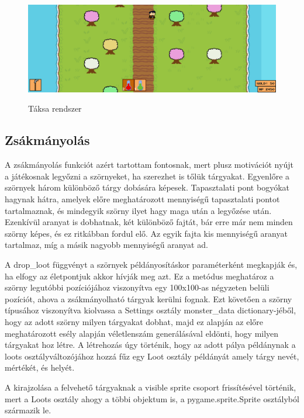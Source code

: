 \begin{figure}[H]
    \centering
    \includegraphics[width=15.5truecm]{images/inventory.png}
    \caption{Táksa rendszer}
    \label{fig:Táska rendszer}\cite{backpack}
\end{figure}

\subsection{Zsákmányolás}

\indent \indent A zsákmányolás funkciót azért tartottam fontosnak, mert plusz motivációt nyújt a játékosnak legyőzni a szörnyeket, ha szerezhet is tőlük tárgyakat. Egyenlőre a szörnyek három különböző tárgy dobására képesek. Tapasztalati pont bogyókat hagynak hátra, amelyek előre meghatározott mennyiségű tapasztalati pontot tartalmaznak, és mindegyik szörny ilyet hagy maga után a legyőzése után. Ezenkívül aranyat is dobhatnak, két különböző fajtát, bár erre már nem minden szörny képes, és ez ritkábban fordul elő. Az egyik fajta kis mennyiségű aranyat tartalmaz, míg a másik nagyobb mennyiségű aranyat ad. 

A drop\_loot függvényt a szörnyek példányosításkor paraméterként megkapják és, ha elfogy az életpontjuk akkor hívják meg azt. Ez a metódus meghatároz a szörny legutóbbi pozíciójához viszonyítva egy 100x100-as négyzeten belüli pozíciót, ahova a zsákmányolható tárgyak kerülni fognak. Ezt követően a szörny típusához viszonyítva kiolvassa a Settings osztály monster\_data dictionary-jéből, hogy az adott szörny milyen tárgyakat dobhat, majd ez alapján az előre meghatározott esély alapján véletlenszám generálásával eldönti, hogy milyen tárgyakat hoz létre. A létrehozás úgy történik, hogy az adott pálya példánynak a loots osztályváltozójához hozzá fűz egy Loot osztály példányát amely tárgy nevét, mértékét, és helyét.

A kirajzolása a felvehető tárgyaknak a visible sprite csoport frissítésével történik, mert a Loots osztály ahogy a többi objektum is, a pygame.sprite.Sprite osztályból származik le.  

